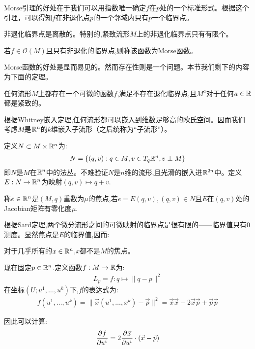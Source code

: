 Morse引理的好处在于我们可以用指数唯一确定$f$在$p$处的一个标准形式。根据这个引理，可以得知$f$在非退化点$p$的一个邻域内只有$p$一个临界点。
\begin{corollary}
	非退化临界点是离散的。特别的,紧致流形$M$上的非退化临界点只有有限个。
\end{corollary}

\begin{definition}[Morse函数]
	若$f\in \mathcal{O}(M)$且只有非退化的临界点,则称该函数为Morse函数。
\end{definition}
Morse函数的好处是显而易见的。然而存在性则是一个问题。本节我们剩下的内容为下面的定理。
\begin{theorem}
	任何流形$M$上都存在一个可微的函数$f$,满足不存在退化临界点,且$M^a$对于任何$a \in \mathbb{R}$都是紧致的。
\end{theorem}

根据Whitney嵌入定理,任何流形都可以嵌入到维数足够高的欧氏空间。因而我们考虑$M$是$\mathbb{R}^n$的$k$维嵌入子流形（之后统称为“子流形”）。

定义$N \subset M\times \mathbb{R}^n$为:
\begin{align*}
	N=\{(q,v):q \in M,v\in T_q\mathbb{R}^n,v\perp M\}
\end{align*}
即$N$是$M$在$\mathbb{R}^n$中的法丛。不难验证$N$是$n$维的流形,且光滑的嵌入进$\mathbb{R}^{2n}$中。定义$E:N \to \mathbb{R}^n$为映射$(q,v)\mapsto q+v$.

\begin{definition}[焦点]
	称$e \in \mathbb{R}^n$是$(M,q)$重数为$\mu$的焦点,若$e=E(q,v),(q,v)\in N$且$E$在$(q,v)$处的Jacobian矩阵有零化度$\mu$.
\end{definition}

根据Sard定理,两个微分流形之间的可微映射的临界点是很有限的——临界值只有$0$测度。显然焦点是$E$的临界值,因而:
\begin{corollary}\label{0focus}
	对于几乎所有的$x \in \mathbb{R}^n$,$x$都不是$M$的焦点。
\end{corollary}

现在固定$p \in \mathbb{R}^n$.定义函数$f:M \to \mathbb{R}$为:
\begin{align}
	L_p=f:q\mapsto\|q-p\|^2
\end{align}
在坐标$(U;u^1,\dots,u^k)$下,$f$的表达式为:
\begin{align*}
	f(u^1,\dots,u^k)=\|\vec{x}(u^1,\dots,x^k)-\vec{p}\|^2=\vec{x}\vec{x}-2\vec{x}\vec{p}+\vec{p}\vec{p}
\end{align*}

因此可以计算:
\begin{align*}
	\frac{\partial^{} f}{\partial {u^i}^{}}=2\frac{\partial^{} \vec{x}}{\partial {u^i}^{}}\cdot(\vec{x}-\vec{p})
\end{align*}

